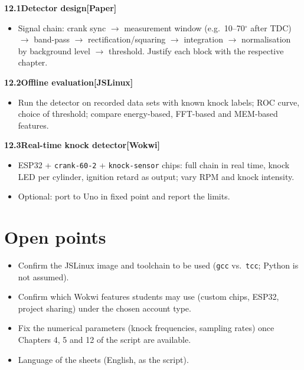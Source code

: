 \documentclass[11pt,a4paper]{article}
\newcommand{\W}{\textsf{\textbf{[Wokwi]}}}
\newcommand{\J}{\textsf{\textbf{[JSLinux]}}}
\newcommand{\Pap}{\textsf{\textbf{[Paper]}}}
\newcommand{\exercise}[4]{%
  \par\smallskip\noindent\textbf{#1\quad #2}\hfill#3\par
  \nopagebreak\begin{itemize}[leftmargin=1.2em]#4\end{itemize}}
\begin{document}
\exercise{12.1}{Detector design}{\Pap}{
  \item Signal chain: crank sync $\rightarrow$ measurement window
    (e.g.\ 10--70$^\circ$ after TDC) $\rightarrow$ band-pass
    $\rightarrow$ rectification/squaring $\rightarrow$ integration
    $\rightarrow$ normalisation by background level $\rightarrow$
    threshold. Justify each block with the respective chapter.}

\exercise{12.2}{Offline evaluation}{\J}{
  \item Run the detector on recorded data sets with known knock labels;
    ROC curve, choice of threshold; compare energy-based, FFT-based and
    MEM-based features.}

\exercise{12.3}{Real-time knock detector}{\W}{
  \item ESP32 + \texttt{crank-60-2} + \texttt{knock-sensor} chips: full
    chain in real time, knock LED per cylinder, ignition retard as
    output; vary RPM and knock intensity.
  \item Optional: port to Uno in fixed point and report the limits.}

\section*{Open points}
\begin{itemize}
  \item Confirm the JSLinux image and toolchain to be used
    (\texttt{gcc} vs.\ \texttt{tcc}; Python is not assumed).
  \item Confirm which Wokwi features students may use (custom chips,
    ESP32, project sharing) under the chosen account type.
  \item Fix the numerical parameters (knock frequencies, sampling rates)
    once Chapters 4, 5 and 12 of the script are available.
  \item Language of the sheets (English, as the script).
\end{itemize}
\end{document}
